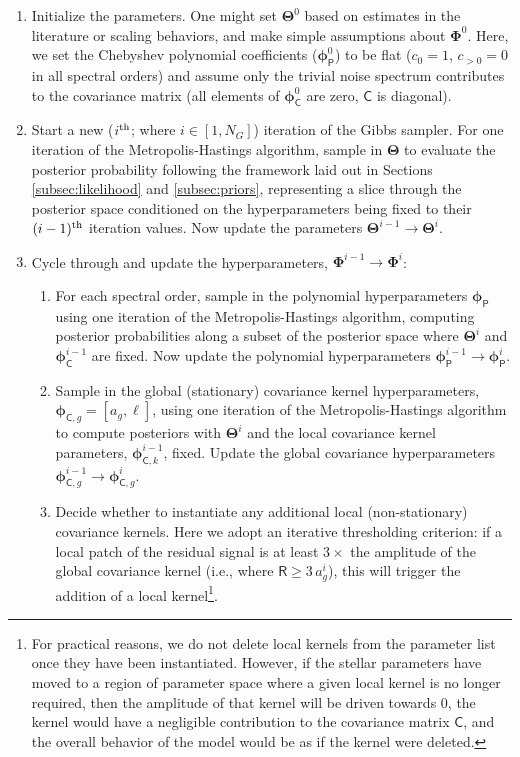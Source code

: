 \documentclass[iop,floatfix]{emulateapj}
\newcommand{\vR}{\mathsf{R}}
\newcommand{\vC}{\mathsf{C}}
\newcommand{\vT}{ {\bm \Theta}}
\newcommand{\vp}{ {\bm \phi}}
\newcommand{\vP}{ {\bm \Phi}}
\newcommand{\cheb}{ \vp_{\mathsf{P}}}
\newcommand{\cov}{ \vp_{\mathsf{C}}}
\begin{document}
\begin{enumerate}
\item Initialize the parameters.  One might set $\vT^0$ based on estimates in the literature or 
scaling behaviors, and make simple assumptions about $\vP^0$.  Here, we set the Chebyshev 
polynomial coefficients ($\cheb^0$) to be flat ($c_0 = 1$,  $c_{>0} = 0$ in all spectral orders) 
and assume only the trivial noise spectrum contributes to the covariance matrix (all elements of 
$\cov^0$ are zero, $\vC$ is diagonal).  

\item Start a new ($i^{\rm th}$; where $i \in [1,N_G]$) iteration of the Gibbs sampler.  For 
one iteration of the Metropolis-Hastings algorithm, sample in $\vT$ to evaluate the posterior 
probability following the framework laid out in Sections \ref{subsec:likelihood} and \ref{subsec:priors}, 
representing a slice through the posterior space conditioned on the hyperparameters being fixed to 
their $(i-1)^{\rm th}$ iteration values.  Now update the parameters $\vT^{i-1} \rightarrow \vT^i$.

\item Cycle through and update the hyperparameters, $\vP^{i-1} \rightarrow \vP^i$:  

\begin{enumerate}
\item For each spectral order, sample in the polynomial hyperparameters $\cheb$ using one 
iteration of the Metropolis-Hastings algorithm, computing posterior probabilities along a subset of the posterior space where $\vT^i$ and $\cov^{i-1}$ are fixed.  Now update the 
polynomial hyperparameters $\cheb^{i-1} \rightarrow \cheb^i$.  

\item Sample in the global (stationary) covariance kernel hyperparameters, $\vp_{{\mathsf C},g} = 
[a_g, \ell]$, using one iteration of the Metropolis-Hastings algorithm to compute posteriors
with $\vT^i$ and the local covariance kernel parameters, $\vp_{{\mathsf C}, k}^{i-1}$, fixed.  
Update the global covariance hyperparameters $\vp_{{\mathsf C}, g}^{i-1} \rightarrow \vp_{{\mathsf 
C}, g}^i$.

\item Decide whether to instantiate any additional local (non-stationary) covariance kernels.  Here 
we adopt an iterative thresholding criterion: if a local patch of the residual signal is at least 
$3\times$ the amplitude of the global covariance kernel (i.e., where $\vR \ge 3
\, a_g^i$), this will trigger the addition of a local kernel\footnote{For
practical reasons, we do not delete local kernels from the parameter list once they have been
instantiated. However, if the stellar parameters have moved to a region of
parameter space where a given local kernel is no longer required, then the
amplitude of that kernel will be driven towards $0$, the kernel would have a
negligible contribution to the covariance matrix $\vC$, and the overall behavior of the model would
be as if the kernel were deleted.}.  


\end{enumerate}
\end{enumerate}
\end{document}
